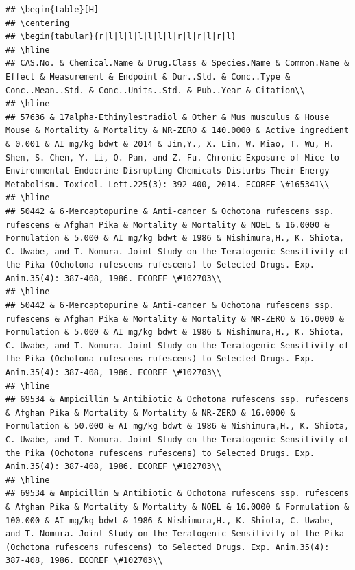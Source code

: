 \documentclass[12pt,]{article}
\begin{document}
\begin{verbatim}
## \begin{table}[H]
## \centering
## \begin{tabular}{r|l|l|l|l|l|l|l|r|l|r|l|r|l}
## \hline
## CAS.No. & Chemical.Name & Drug.Class & Species.Name & Common.Name & Effect & Measurement & Endpoint & Dur..Std. & Conc..Type & Conc..Mean..Std. & Conc..Units..Std. & Pub..Year & Citation\\
## \hline
## 57636 & 17alpha-Ethinylestradiol & Other & Mus musculus & House Mouse & Mortality & Mortality & NR-ZERO & 140.0000 & Active ingredient & 0.001 & AI mg/kg bdwt & 2014 & Jin,Y., X. Lin, W. Miao, T. Wu, H. Shen, S. Chen, Y. Li, Q. Pan, and Z. Fu. Chronic Exposure of Mice to Environmental Endocrine-Disrupting Chemicals Disturbs Their Energy Metabolism. Toxicol. Lett.225(3): 392-400, 2014. ECOREF \#165341\\
## \hline
## 50442 & 6-Mercaptopurine & Anti-cancer & Ochotona rufescens ssp. rufescens & Afghan Pika & Mortality & Mortality & NOEL & 16.0000 & Formulation & 5.000 & AI mg/kg bdwt & 1986 & Nishimura,H., K. Shiota, C. Uwabe, and T. Nomura. Joint Study on the Teratogenic Sensitivity of the Pika (Ochotona rufescens rufescens) to Selected Drugs. Exp. Anim.35(4): 387-408, 1986. ECOREF \#102703\\
## \hline
## 50442 & 6-Mercaptopurine & Anti-cancer & Ochotona rufescens ssp. rufescens & Afghan Pika & Mortality & Mortality & NR-ZERO & 16.0000 & Formulation & 5.000 & AI mg/kg bdwt & 1986 & Nishimura,H., K. Shiota, C. Uwabe, and T. Nomura. Joint Study on the Teratogenic Sensitivity of the Pika (Ochotona rufescens rufescens) to Selected Drugs. Exp. Anim.35(4): 387-408, 1986. ECOREF \#102703\\
## \hline
## 69534 & Ampicillin & Antibiotic & Ochotona rufescens ssp. rufescens & Afghan Pika & Mortality & Mortality & NR-ZERO & 16.0000 & Formulation & 50.000 & AI mg/kg bdwt & 1986 & Nishimura,H., K. Shiota, C. Uwabe, and T. Nomura. Joint Study on the Teratogenic Sensitivity of the Pika (Ochotona rufescens rufescens) to Selected Drugs. Exp. Anim.35(4): 387-408, 1986. ECOREF \#102703\\
## \hline
## 69534 & Ampicillin & Antibiotic & Ochotona rufescens ssp. rufescens & Afghan Pika & Mortality & Mortality & NOEL & 16.0000 & Formulation & 100.000 & AI mg/kg bdwt & 1986 & Nishimura,H., K. Shiota, C. Uwabe, and T. Nomura. Joint Study on the Teratogenic Sensitivity of the Pika (Ochotona rufescens rufescens) to Selected Drugs. Exp. Anim.35(4): 387-408, 1986. ECOREF \#102703\\

\end{verbatim}
\end{document}
